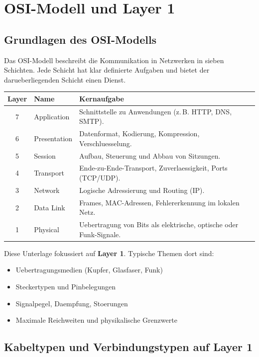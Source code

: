 \documentclass[11pt, oneside, numbers=noenddot]{scrbook}
\begin{document}

\cleardoublepage
{}
\tableofcontents
\clearpage
{}

\chapter{OSI-Modell und Layer 1}
\section{Grundlagen des OSI-Modells}
Das OSI-Modell beschreibt die Kommunikation in Netzwerken in sieben Schichten. Jede Schicht hat klar definierte Aufgaben und bietet der darueberliegenden Schicht einen Dienst.

\begin{longtable}{|c|l|p{8cm}|}
\hline
\textbf{Layer} & \textbf{Name} & \textbf{Kernaufgabe} \\
\hline
7 & Application & Schnittstelle zu Anwendungen (z.\,B. HTTP, DNS, SMTP). \\
\hline
6 & Presentation & Datenformat, Kodierung, Kompression, Verschluesselung. \\
\hline
5 & Session & Aufbau, Steuerung und Abbau von Sitzungen. \\
\hline
4 & Transport & Ende-zu-Ende-Transport, Zuverlaessigkeit, Ports (TCP/UDP). \\
\hline
3 & Network & Logische Adressierung und Routing (IP). \\
\hline
2 & Data Link & Frames, MAC-Adressen, Fehlererkennung im lokalen Netz. \\
\hline
1 & Physical & Uebertragung von Bits als elektrische, optische oder Funk-Signale. \\
\hline
\end{longtable}

Diese Unterlage fokussiert auf \textbf{Layer 1}. Typische Themen dort sind:
\begin{itemize}
\item Uebertragungsmedien (Kupfer, Glasfaser, Funk)
\item Steckertypen und Pinbelegungen
\item Signalpegel, Daempfung, Stoerungen
\item Maximale Reichweiten und physikalische Grenzwerte
\end{itemize}

\section{Kabeltypen und Verbindungstypen auf Layer 1}
\end{document}

